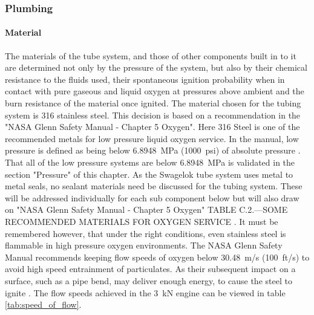             \subsubsection{Plumbing}
            \paragraph{Material}
                The materials of the tube system, and those of other components built in to it are determined not only by the pressure of the system, but also by their chemical resistance to the fluids used, their spontaneous ignition probability when in contact with pure gaseous and liquid oxygen at pressures above ambient and the burn resistance of the material once ignited. The material chosen for the tubing system is 316 stainless steel. This decision is based on a recommendation in the "NASA Glenn Safety Manual - Chapter 5 Oxygen". Here 316 Steel is one of the recommended metals for low pressure liquid oxygen service. In the manual, low pressure is defined as being below \qty{6.8948}{MPa} (\qty{1000}{psi}) of absolute pressure \cite[21]{glenn}. That all of the low pressure systems are below \qty{6.8948}{MPa} is validated in the section "Pressure" of this chapter. As the Swagelok tube system uses metal to metal seals, no sealant materials need be discussed for the tubing system. These will be addressed individually for each sub component below but will also draw on "NASA Glenn Safety Manual - Chapter 5 Oxygen" TABLE C.2.—SOME RECOMMENDED MATERIALS FOR OXYGEN SERVICE \cite[46]{glenn}. It must be remembered however, that under the right conditions, even stainless steel is flammable in high pressure oxygen environments. The NASA Glenn Safety Manual recommends keeping flow speeds of oxygen below \qty{30.48}{m/s} (\qty{100}{ft/s}) to avoid high speed entrainment of particulates. As their subsequent impact on a surface, such as a pipe bend, may deliver enough energy, to cause the steel to ignite \cite[25]{glenn}. The flow speeds achieved in the \qty{3}{kN} engine can be viewed in table \ref{tab:speed_of_flow}.

